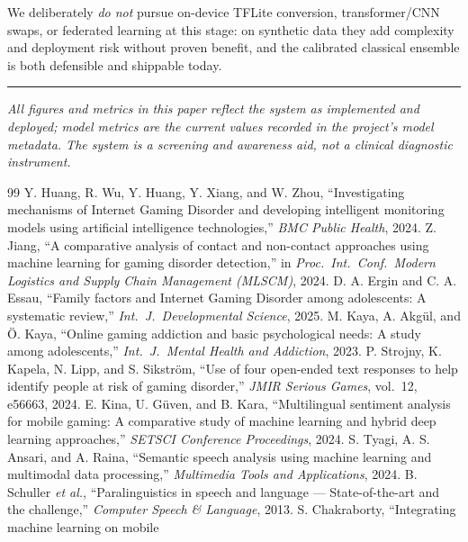\documentclass[11pt,a4paper]{article}
\begin{document}
We deliberately \emph{do not} pursue on-device TFLite conversion, transformer/CNN
swaps, or federated learning at this stage: on synthetic data they add complexity and
deployment risk without proven benefit, and the calibrated classical ensemble
is both defensible and shippable today.

\vspace{1.5em}
\hrule
\vspace{0.5em}
{\small \textit{All figures and metrics in this paper reflect the system as
implemented and deployed; model metrics are the current values recorded in the
project's model metadata. The system is a screening and awareness aid, not a
clinical diagnostic instrument.}}

\begin{thebibliography}{99}
\small
{} Y. Huang, R. Wu, Y. Huang, Y. Xiang, and W. Zhou,
``Investigating mechanisms of Internet Gaming Disorder and developing intelligent
monitoring models using artificial intelligence technologies,'' \emph{BMC Public
Health}, 2024.
 Z. Jiang, ``A comparative analysis of contact and non-contact
approaches using machine learning for gaming disorder detection,'' in \emph{Proc.\ Int.\
Conf.\ Modern Logistics and Supply Chain Management (MLSCM)}, 2024.
\bibitem{ergin2025} D. A. Ergin and C. A. Essau, ``Family factors and Internet Gaming
Disorder among adolescents: A systematic review,'' \emph{Int.\ J.\ Developmental
Science}, 2025.
 M. Kaya, A. Akg\"ul, and \"O. Kaya, ``Online gaming addiction and
basic psychological needs: A study among adolescents,'' \emph{Int.\ J.\ Mental Health and
Addiction}, 2023.
 P. Strojny, K. Kapela, N. Lipp, and S. Sikstr\"om, ``Use of four
open-ended text responses to help identify people at risk of gaming disorder,'' \emph{JMIR
Serious Games}, vol.\ 12, e56663, 2024.
 E. Kina, U. G\"uven, and B. Kara, ``Multilingual sentiment analysis
for mobile gaming: A comparative study of machine learning and hybrid deep learning
approaches,'' \emph{SETSCI Conference Proceedings}, 2024.
 S. Tyagi, A. S. Ansari, and A. Raina, ``Semantic speech analysis
using machine learning and multimodal data processing,'' \emph{Multimedia Tools and
Applications}, 2024.
 B. Schuller \emph{et al.}, ``Paralinguistics in speech and
language --- State-of-the-art and the challenge,'' \emph{Computer Speech \& Language},
2013.
 S. Chakraborty, ``Integrating machine learning on mobile

\end{thebibliography}
\end{document}
